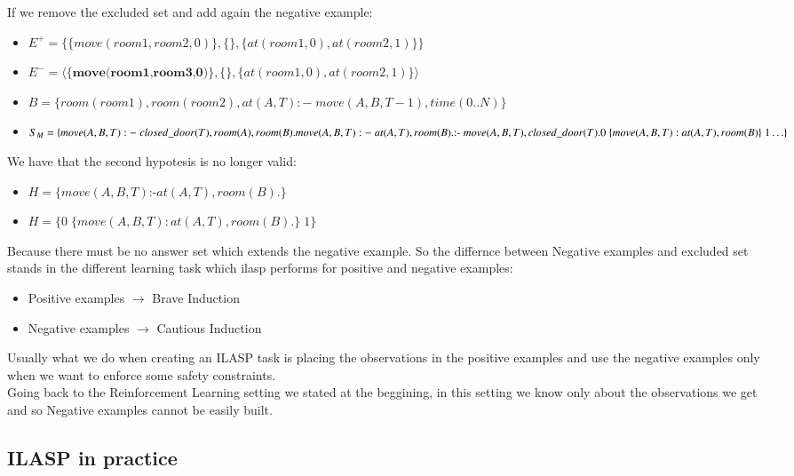 If we remove the excluded set and add again the negative example:
\begin{itemize}
    \item $E^+ = \{\{move(room1,room2,0)\},\{\}, \{at(room1,0),at(room2,1)\}\}$
    \item $E^- = \langle\{\textbf{move(room1,room3,0)}\},\{\},\{at(room1,0),at(room2,1)\}\rangle$
    \item $B = \{room(room1), room(room2), at(A,T) :-\; move(A,B,T-1), time(0..N)\}$
    \item $S_{M}=\{\\
                move(A,B,T) :-\; closed\_door(T), room(A), room(B). \\
                move(A,B,T) :-\; at(A,T), room(B).\\
                \text{:-}\; move(A,B,T), closed\_door(T).\\
                0\;\{move(A,B,T) : at(A,T), room(B)\}\;1\\
                \ldots\} \;$
\end{itemize}
We have that the second hypotesis is no longer valid:
\begin{itemize}
    \item $H = \{move(A,B,T) \text{:-} at(A,T), room(B).\}$
    \item\st{$H = \{0\; \{move(A,B,T) : at(A,T), room(B).\}\; 1\}$}
\end{itemize}
Because there must be no answer set which extends the negative example.
So the differnce between Negative examples and excluded set stands in the 
different learning task which ilasp performs for positive and negative examples:
\begin{itemize}
    \item Positive examples $\rightarrow$ Brave Induction
    \item Negative examples $\rightarrow$ Cautious Induction
\end{itemize}

Usually what we do when creating an ILASP task is placing the observations in 
the positive examples and use the negative examples only when we want to enforce some safety constraints.\\

Going back to the Reinforcement Learning setting we stated at the beggining,
in this setting we know only about the observations we get and so Negative examples cannot be easily built.

\subsection{ILASP in practice}
